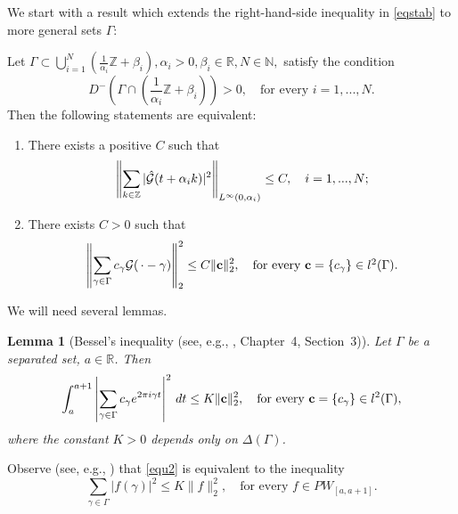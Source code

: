 \documentclass[12pt]{amsart}
\numberwithin{equation}{section}
\newtheorem{lemma}[theorem]{Lemma}
\newcommand{\R}{{\mathbb R}} \newcommand{\Q}{{\mathbb Q}} \newcommand{\Z}{{\mathbb Z}} \newcommand{\N}{{\mathbb N}}
\begin{document}
We start with a result which extends the right-hand-side inequality in \eqref{eqstab} to more general sets $\Gamma$:

\begin{proposition}\label{lemaa_int_rhs_equiv_general}
Let $\Gamma \subset \bigcup\limits_{i=1}^N (\frac{1}{\alpha_i} \Z + \beta_i), \alpha_i >0, \beta_i \in \R, N\in\N,$ satisfy  the condition
\begin{equation}\label{dGammaZi}
    D^{-}\left(\Gamma \cap \left(\frac{1}{\alpha_i}\Z + \beta_i\right)\right) > 0, \quad \text{for every  }i =1,...,N.
\end{equation}
 Then the following statements are equivalent{\rm:}
\begin{enumerate}
    \item[$(i)$] There exists a positive $C$ such that
    \begin{equation}\label{sever_progressions_Ghat}
        \left\| \sum\limits_{k \in \Z} |\hat{\Ff}(t + \alpha_i k)|^2 \right\|_{L^{\infty}(0,{\alpha_i})} \le C,\quad i =1,...,N;
    \end{equation}
    \item[$(ii)$] There exists $C>0$ such that 
    \begin{equation*}
        \left\|\sum_{\gamma \in \Gamma} c_{\gamma} \mathcal{G}(\,\cdot - \gamma) \right\|^2_2 \le C \|{\bf c}\|_2^2,\quad \mbox{for every ${\bf c}=\{c_\gamma\} \in l^2(\Gamma).$}
    \end{equation*}
\end{enumerate}
\end{proposition}


We will need several lemmas.
\begin{lemma}[Bessel's inequality (see, e.g., \cite{MR1836633}, Chapter~4, Section~3)]\label{bes}
Let $\Gamma$ be a separated set, $a\in \R$. Then
\begin{equation}\label{equ2}
    \int_a^{a+1}\left| \sum_{\gamma\in\Gamma}c_\gamma e^{2\pi i \gamma t}  \right|^2\,dt\leq K \|{\bf c}\|_2^2,\quad \mbox{for every } {\bf c}=\{c_\gamma\}\in l^2(\Gamma),
\end{equation}where the constant $K>0$  depends only on $\Delta(\Gamma)$.   
\end{lemma}

Observe  (see, e.g.,  \cite[Lecture~2.5]{ou}) that \eqref{equ2} is equivalent to the inequality
\begin{equation}\label{equ20}
 \sum_{\gamma\in\Gamma}|f(\gamma)|^2\leq K\|f\|_2^2,  \quad \mbox{for every } f\in PW_{[a,a+1]}.
\end{equation}
\end{document}
